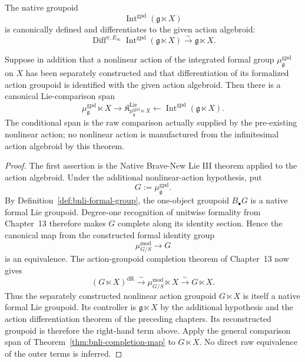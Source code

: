 \begin{theorem}
\label{thm:bnli-action-integration}
The native groupoid
\[
\boxed{
    \operatorname{Int}^{\mathrm{gpd}}
    \left(
      \mathfrak g\ltimes X
    \right)}
\]
is canonically defined and differentiates to the given action algebroid:
\[
    \operatorname{Diff}^{\pi,E_\infty}
    \operatorname{Int}^{\mathrm{gpd}}
    (\mathfrak g\ltimes X)
    \xrightarrow{\sim}
    \mathfrak g\ltimes X.
\]

Suppose in addition that a nonlinear action of the integrated formal group
$\mu^{\mathrm{gpd}}_{\mathfrak g}$ on $X$ has been separately constructed and
that differentiation of its formalized action groupoid is identified with the
given action algebroid.  Then there is a canonical Lie-comparison span
\[
\boxed{
    \mu^{\mathrm{gpd}}_{\mathfrak g}\ltimes X
    \longrightarrow
    \mathfrak K^{\mathrm{Lie}}_{\mu^{\mathrm{gpd}}_{\mathfrak g}\ltimes X}
    \longleftarrow
    \operatorname{Int}^{\mathrm{gpd}}
    (\mathfrak g\ltimes X).}
\]
The conditional span is the raw comparison actually supplied by the
pre-existing nonlinear action; no nonlinear action is manufactured from the
infinitesimal action algebroid by this theorem.
\end{theorem}

\begin{proof}
The first assertion is the Native Brave-New Lie III theorem applied to the
action algebroid.  Under the additional nonlinear-action hypothesis, put
\[
    G:=\mu^{\mathrm{gpd}}_{\mathfrak g}.
\]
By Definition~\ref{def:bnli-formal-group}, the one-object groupoid
$B_\bullet G$ is a native formal Lie groupoid.  Degree-one recognition of
unitwise formality from Chapter~13 therefore makes $G$ complete along its
identity section.  Hence the canonical map from the constructed formal
identity group
\[
    \mu^{\mathrm{mod}}_{G/S}\longrightarrow G
\]
is an equivalence.  The action-groupoid completion theorem of Chapter~13 now
gives
\[
    (G\ltimes X)^{\mathrm{dR}}
    \xrightarrow{\sim}
    \mu^{\mathrm{mod}}_{G/S}\ltimes X
    \xrightarrow{\sim}
    G\ltimes X.
\]
Thus the separately constructed nonlinear action groupoid $G\ltimes X$ is
itself a native formal Lie groupoid.  Its controller is
$\mathfrak g\ltimes X$ by the additional hypothesis and the action
differentiation theorem of the preceding chapters.  Its reconstructed
groupoid is therefore the right-hand term above.  Apply the general comparison
span of Theorem~\ref{thm:bnli-completion-map} to $G\ltimes X$.  No direct raw
equivalence of the outer terms is inferred.
\end{proof}

